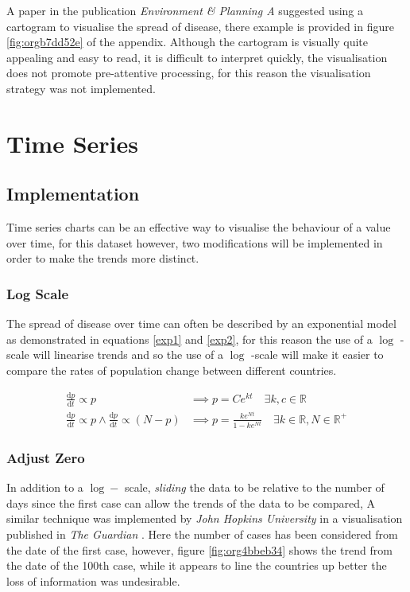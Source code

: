 \documentclass[11pt]{article}
\begin{document}
A paper in the publication \emph{Environment \& Planning A} suggested using a
cartogram to visualise the spread of disease, there example is provided in
figure \ref{fig:orgb7dd52e} of the appendix. \cite{gao2020} Although the cartogram is visually
quite appealing and easy to read, it is difficult to interpret quickly, the
visualisation does not promote pre-attentive processing, for this reason the
visualisation strategy was not implemented.

\section{Time Series}
\label{sec:org4957c46}
\subsection{Implementation}
\label{sec:org7595a19}
Time series charts can be an effective way to visualise the behaviour of a value
over time, for this dataset however, two modifications will be implemented in
order to make the trends more distinct.

\subsubsection{Log Scale}
\label{sec:orge5a6140}
The spread of disease over time can often be described by an exponential model as
demonstrated in equations \eqref{exp1} and \eqref{exp2}, for this reason the use of
a \(\log\) -scale will linearise trends and so the use of a \(\log\) -scale will make
it easier to compare the rates of population change between different countries.



\begin{align}
  \frac{\mathrm{d} p}{\mathrm{d} t} \propto p &\implies p = Ce^{kt} \quad \exists k,c \in \mathbb{R} \label{exp1} \\
  \frac{\mathrm{d} p}{\mathrm{d} t} \propto p \wedge    \frac{\mathrm{d} p}{\mathrm{d} t} \propto (N-p) &\implies p = \frac{ke^{Nt}}{1-ke^{Nt}} \quad \exists k \in \mathbb{R}, N \in \mathbb{R^+} \label{exp2}
\end{align}

\subsubsection{Adjust Zero}
\label{sec:orgfa6e39c}
In addition to a \(\log-\) scale, \emph{sliding} the data to be relative to the number
of days since the first case can allow the trends of the data to be compared, A
similar technique was implemented by \emph{John Hopkins University} in a
visualisation published in \emph{The Guardian} \cite{gutierrez2020}. \label{orgb846a90} Here the
number of cases has been considered from the date of the first case, however,
figure \ref{fig:org4bbeb34} shows the trend from the date of the 100th case, while it appears to
line the countries up better the loss of information was undesirable.
\end{document}
